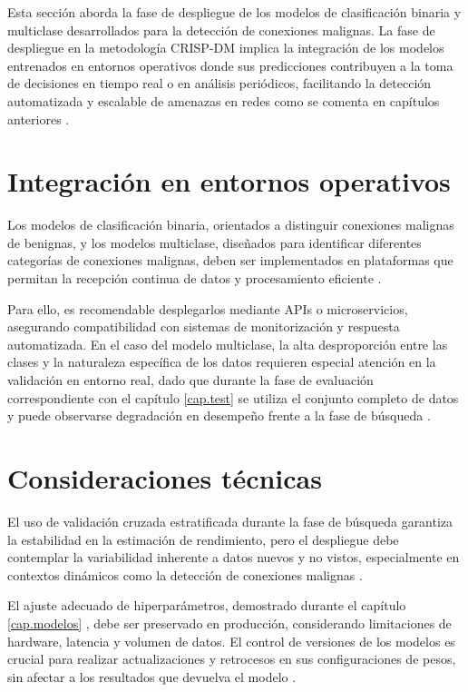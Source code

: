 Esta sección aborda la fase de despliegue de los modelos de clasificación binaria y multiclase desarrollados para la detección de conexiones malignas. La fase de despliegue en la metodología CRISP-DM implica la integración de los modelos entrenados en entornos operativos donde sus predicciones contribuyen a la toma de decisiones en tiempo real o en análisis periódicos, facilitando la detección automatizada y escalable de amenazas en redes como se comenta en capítulos anteriores \cite{wirth2000crisp}.

\section{Integración en entornos operativos}

Los modelos de clasificación binaria, orientados a distinguir conexiones malignas de benignas, y los modelos multiclase, diseñados para identificar diferentes categorías de conexiones malignas, deben ser implementados en plataformas que permitan la recepción continua de datos y procesamiento eficiente \cite{baylor2017tensorflow}. 

Para ello, es recomendable desplegarlos mediante APIs o microservicios, asegurando compatibilidad con sistemas de monitorización y respuesta automatizada. En el caso del modelo multiclase, la alta desproporción entre las clases y la naturaleza específica de los datos requieren especial atención en la validación en entorno real, dado que durante la fase de evaluación correspondiente con el capítulo \ref{cap.test}  se utiliza el conjunto completo de datos y puede observarse degradación en desempeño frente a la fase de búsqueda \cite{gama2014survey}.

\section{Consideraciones técnicas}

El uso de validación cruzada estratificada durante la fase de búsqueda garantiza la estabilidad en la estimación de rendimiento, pero el despliegue debe contemplar la variabilidad inherente a datos nuevos y no vistos, especialmente en contextos dinámicos como la detección de conexiones malignas \cite{reimers2017optimal}. 

El ajuste adecuado de hiperparámetros, demostrado durante el capítulo \ref{cap.modelos} , debe ser preservado en producción, considerando limitaciones de hardware, latencia y volumen de datos. El control de versiones de los modelos es crucial para realizar actualizaciones y retrocesos en sus configuraciones de pesos, sin afectar a los resultados que devuelva el modelo \cite{peters2017machine}.

